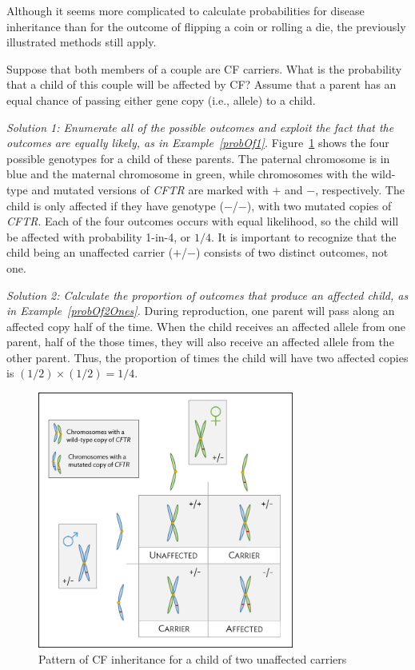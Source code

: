 Although it seems more complicated to calculate probabilities for disease inheritance than for the outcome of flipping a coin or rolling a die, the previously illustrated methods still apply.

\begin{example} {Suppose that both members of a couple are CF carriers. What is the probability that a child of this couple will be affected by CF? Assume that a parent has an equal chance of passing either gene copy (i.e., allele) to a child.}\label{CFInheritanceExample}

\textit{Solution 1: Enumerate all of the possible outcomes and exploit the fact that the outcomes are equally likely, as in Example~\ref{probOf1}.}  Figure~\ref{fig:cfInheritance} shows the four possible genotypes for a child of these parents. The paternal chromosome is in blue and the maternal chromosome in green, while chromosomes with the wild-type and mutated versions of \textit{CFTR} are marked with $+$ and $-$, respectively. The child is only affected if they have genotype ($-$/$-$), with two mutated copies of \textit{CFTR}. Each of the four outcomes occurs with equal likelihood, so the child will be affected with probability 1-in-4, or $1/4$.  It is important to recognize that the child being an unaffected carrier ($+$/$-$) consists of two distinct outcomes, not one. 

\textit{Solution 2:  Calculate the proportion of outcomes that produce an affected child, as in Example~\ref{probOf2Ones}.}  During reproduction, one parent will pass along an affected copy half of the time.  When the child receives an affected allele from one parent, half of the those times, they will also receive an affected allele from the other parent. Thus, the proportion of times the child will have two affected copies is $(1/2) \times (1/2) = 1/4$.
\end{example}

\begin{figure}[h!]
	\centering
	\includegraphics[width= 0.75\textwidth]{ch_probability_oi_biostat/figures/cfInheritance/cfInheritance.png}
	\caption{Pattern of CF inheritance for a child of two unaffected carriers}
	\label{fig:cfInheritance}
\end{figure}

